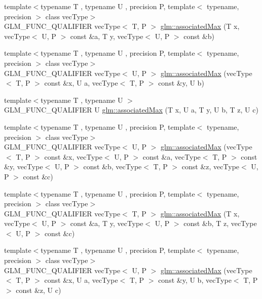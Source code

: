 \begin{DoxyCompactItemize}
\item 
{\footnotesize template$<$typename T , typename U , precision P, template$<$ typename, precision $>$ class vec\+Type$>$ }\\G\+L\+M\+\_\+\+F\+U\+N\+C\+\_\+\+Q\+U\+A\+L\+I\+F\+I\+E\+R vec\+Type$<$ T, P $>$ \hyperlink{group__gtx__associated__min__max_ga62ca63cca6b21387b8a25474f441a869}{glm\+::associated\+Max} (T x, vec\+Type$<$ U, P $>$ const \&a, T y, vec\+Type$<$ U, P $>$ const \&b)
\item 
{\footnotesize template$<$typename T , typename U , precision P, template$<$ typename, precision $>$ class vec\+Type$>$ }\\G\+L\+M\+\_\+\+F\+U\+N\+C\+\_\+\+Q\+U\+A\+L\+I\+F\+I\+E\+R vec\+Type$<$ U, P $>$ \hyperlink{group__gtx__associated__min__max_ga5364520173815b66a9d9e452c38bf312}{glm\+::associated\+Max} (vec\+Type$<$ T, P $>$ const \&x, U a, vec\+Type$<$ T, P $>$ const \&y, U b)
\item 
{\footnotesize template$<$typename T , typename U $>$ }\\G\+L\+M\+\_\+\+F\+U\+N\+C\+\_\+\+Q\+U\+A\+L\+I\+F\+I\+E\+R U \hyperlink{group__gtx__associated__min__max_gaec891e363d91abbf3a4443cf2f652209}{glm\+::associated\+Max} (T x, U a, T y, U b, T z, U c)
\item 
{\footnotesize template$<$typename T , typename U , precision P, template$<$ typename, precision $>$ class vec\+Type$>$ }\\G\+L\+M\+\_\+\+F\+U\+N\+C\+\_\+\+Q\+U\+A\+L\+I\+F\+I\+E\+R vec\+Type$<$ U, P $>$ \hyperlink{group__gtx__associated__min__max_ga065a0c1eb7837118ef79be88dfd78487}{glm\+::associated\+Max} (vec\+Type$<$ T, P $>$ const \&x, vec\+Type$<$ U, P $>$ const \&a, vec\+Type$<$ T, P $>$ const \&y, vec\+Type$<$ U, P $>$ const \&b, vec\+Type$<$ T, P $>$ const \&z, vec\+Type$<$ U, P $>$ const \&c)
\item 
{\footnotesize template$<$typename T , typename U , precision P, template$<$ typename, precision $>$ class vec\+Type$>$ }\\G\+L\+M\+\_\+\+F\+U\+N\+C\+\_\+\+Q\+U\+A\+L\+I\+F\+I\+E\+R vec\+Type$<$ T, P $>$ \hyperlink{group__gtx__associated__min__max_ga553431a468e251623408603bcb51c9cb}{glm\+::associated\+Max} (T x, vec\+Type$<$ U, P $>$ const \&a, T y, vec\+Type$<$ U, P $>$ const \&b, T z, vec\+Type$<$ U, P $>$ const \&c)
\item 
{\footnotesize template$<$typename T , typename U , precision P, template$<$ typename, precision $>$ class vec\+Type$>$ }\\G\+L\+M\+\_\+\+F\+U\+N\+C\+\_\+\+Q\+U\+A\+L\+I\+F\+I\+E\+R vec\+Type$<$ U, P $>$ \hyperlink{group__gtx__associated__min__max_ga327136e6a568569c03a056f90814b656}{glm\+::associated\+Max} (vec\+Type$<$ T, P $>$ const \&x, U a, vec\+Type$<$ T, P $>$ const \&y, U b, vec\+Type$<$ T, P $>$ const \&z, U c)

\end{DoxyCompactItemize}
